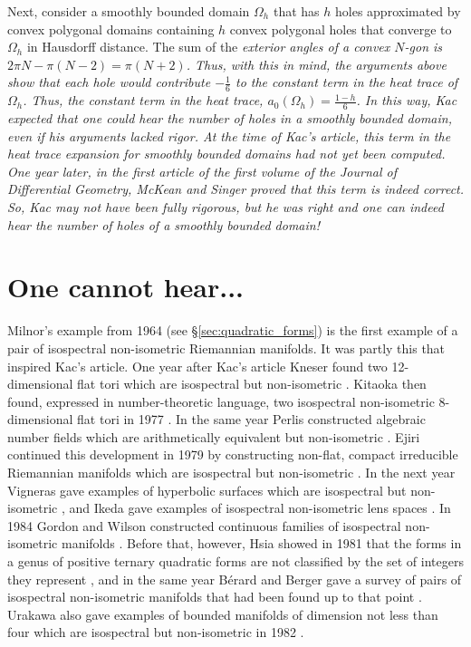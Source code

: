 \documentclass{amsart}
\theoremstyle{definition}
\begin{document}
Next, consider a smoothly bounded domain $\Omega_h$ that has $h$ holes approximated by convex polygonal domains containing $h$ convex polygonal holes that converge to $\Omega_h$ in Hausdorff distance.  The sum of the \em exterior \em angles of a convex $N$-gon is $2\pi N - \pi(N-2) = \pi(N+2)$.  Thus, with this in mind, the arguments above show that each hole would contribute $-\frac 1 6$ to the constant term in the heat trace of $\Omega_h$.  Thus, the constant term in the heat trace, $a_0(\Omega_h) = \frac{1-h}{6}$.  In this way, Kac expected that one could hear the number of holes in a smoothly bounded domain, even if his arguments lacked rigor.  At the time of Kac's article, this term in the heat trace expansion for smoothly bounded domains had not yet been computed.  One year later, in the first article of the first volume of the Journal of Differential Geometry, McKean and Singer proved that this term is indeed correct.  So, Kac may not have been fully rigorous, but he was right \cite{mckean1967curvature} and one can indeed hear the number of holes of a smoothly bounded domain!   


\section{One cannot hear...}
\label{sec:Kac_legacy}


Milnor's example from 1964 (see \S\ref{sec:quadratic_forms}) is the first example of a pair of isospectral non-isometric Riemannian manifolds. It was partly this that inspired Kac's article. One year after Kac's article Kneser found two 12-dimensional flat tori which are isospectral but non-isometric \cite{kneser1967lineare}. Kitaoka then found, expressed in number-theoretic language, two isospectral non-isometric 8-dimensional flat tori in 1977 \cite{kitaoka1977positive}. In the same year Perlis constructed algebraic number fields which are arithmetically equivalent but non-isometric \cite{perlis1977equation}. Ejiri continued this development in 1979 by constructing non-flat, compact irreducible Riemannian manifolds which are isospectral but non-isometric \cite{ejiri1979construction}. In the next year Vigneras gave examples of hyperbolic surfaces which are isospectral but non-isometric \cite{vigneras1980varietes}, and Ikeda gave examples of isospectral non-isometric lens spaces \cite{ikeda1980lens}. In 1984 Gordon and Wilson constructed continuous families of isospectral non-isometric manifolds \cite{gordon1984isospectral}. Before that, however, Hsia showed in 1981 that the forms in a genus of positive ternary quadratic forms are not classified by the set of integers they represent \cite{hsia1981regular}, and in the same year Bérard and Berger gave a survey of pairs of isospectral non-isometric manifolds that had been found up to that point \cite{berard1981spectre}. Urakawa also gave examples of bounded manifolds of dimension not less than four which are isospectral but non-isometric in 1982 \cite{urakawa1982bounded}. 
\end{document}
